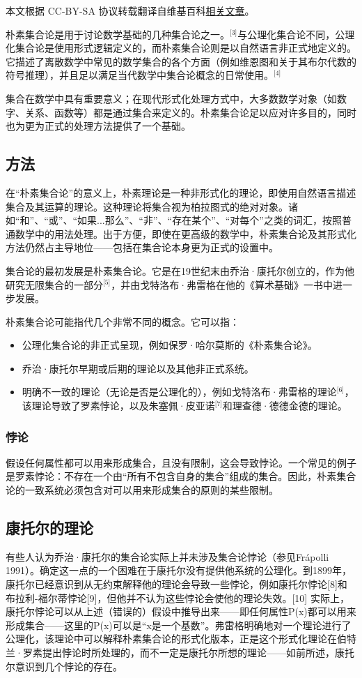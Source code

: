 
本文根据 CC-BY-SA 协议转载翻译自维基百科\href{https://en.wikipedia.org/wiki/Naive_set_theory}{相关文章}。

朴素集合论是用于讨论数学基础的几种集合论之一。\(^\text{[3]}\)与公理化集合论不同，公理化集合论是使用形式逻辑定义的，而朴素集合论则是以自然语言非正式地定义的。它描述了离散数学中常见的数学集合的各个方面（例如维恩图和关于其布尔代数的符号推理），并且足以满足当代数学中集合论概念的日常使用。\(^\text{[4]}\)

集合在数学中具有重要意义；在现代形式化处理方式中，大多数数学对象（如数字、关系、函数等）都是通过集合来定义的。朴素集合论足以应对许多目的，同时也为更为正式的处理方法提供了一个基础。
\subsection{方法}  
在“朴素集合论”的意义上，朴素理论是一种非形式化的理论，即使用自然语言描述集合及其运算的理论。这种理论将集合视为柏拉图式的绝对对象。诸如“和”、“或”、“如果...那么”、“非”、“存在某个”、“对每个”之类的词汇，按照普通数学中的用法处理。出于方便，即使在更高级的数学中，朴素集合论及其形式化方法仍然占主导地位——包括在集合论本身更为正式的设置中。

集合论的最初发展是朴素集合论。它是在19世纪末由乔治·康托尔创立的，作为他研究无限集合的一部分\(^\text{[5]}\)，并由戈特洛布·弗雷格在他的《算术基础》一书中进一步发展。

朴素集合论可能指代几个非常不同的概念。它可以指：
\begin{itemize}
\item 公理化集合论的非正式呈现，例如保罗·哈尔莫斯的《朴素集合论》。
\item 乔治·康托尔早期或后期的理论以及其他非正式系统。
\item 明确不一致的理论（无论是否是公理化的），例如戈特洛布·弗雷格的理论\(^\text{[6]}\)，该理论导致了罗素悖论，以及朱塞佩·皮亚诺\(^\text{[7]}\)和理查德·德德金德的理论。
\end{itemize}
\subsubsection{悖论}  
假设任何属性都可以用来形成集合，且没有限制，这会导致悖论。一个常见的例子是罗素悖论：不存在一个由“所有不包含自身的集合”组成的集合。因此，朴素集合论的一致系统必须包含对可以用来形成集合的原则的某些限制。
\subsection{康托尔的理论}  
有些人认为乔治·康托尔的集合论实际上并未涉及集合论悖论（参见Frápolli 1991）。确定这一点的一个困难在于康托尔没有提供他系统的公理化。到1899年，康托尔已经意识到从无约束解释他的理论会导致一些悖论，例如康托尔悖论[8]和布拉利-福尔蒂悖论[9]，但他并不认为这些悖论会使他的理论失效。[10] 实际上，康托尔悖论可以从上述（错误的）假设中推导出来——即任何属性P(x)都可以用来形成集合——这里的P(x)可以是“x是一个基数”。弗雷格明确地对一个理论进行了公理化，该理论中可以解释朴素集合论的形式化版本，正是这个形式化理论在伯特兰·罗素提出悖论时所处理的，而不一定是康托尔所想的理论——如前所述，康托尔意识到几个悖论的存在。